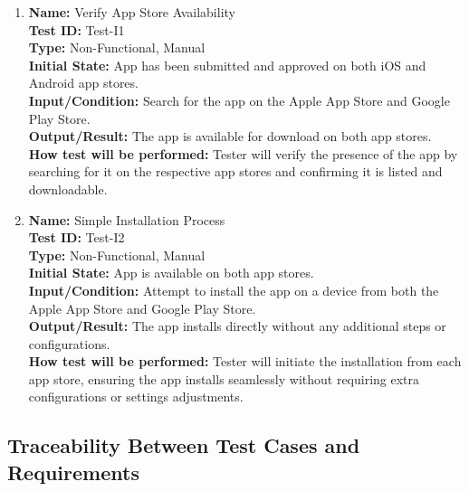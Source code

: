 \documentclass[12pt, titlepage]{article}
\begin{document}
\begin{enumerate}
\begin{enumerate}
    \item \textbf{Name:} Verify App Store Availability \label{itm:Test-I1} \\
    \textbf{Test ID:} Test-I1 \\
    \textbf{Type:} Non-Functional, Manual \\
    \textbf{Initial State:} App has been submitted and approved on both iOS and Android app stores. \\
    \textbf{Input/Condition:} Search for the app on the Apple App Store and Google Play Store. \\
    \textbf{Output/Result:} The app is available for download on both app stores. \\
    \textbf{How test will be performed:} Tester will verify the presence of the app by searching for it on the respective app stores and confirming it is listed and downloadable.

    \item \textbf{Name:} Simple Installation Process \label{itm:Test-I2} \\
    \textbf{Test ID:} Test-I2 \\
    \textbf{Type:} Non-Functional, Manual \\
    \textbf{Initial State:} App is available on both app stores. \\
    \textbf{Input/Condition:} Attempt to install the app on a device from both the Apple App Store and Google Play Store. \\
    \textbf{Output/Result:} The app installs directly without any additional steps or configurations. \\
    \textbf{How test will be performed:} Tester will initiate the installation from each app store, ensuring the app installs seamlessly without requiring extra configurations or settings adjustments.
\end{enumerate}


\subsection{Traceability Between Test Cases and Requirements}



\end{enumerate}
\end{document}
